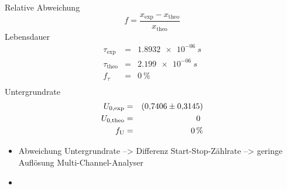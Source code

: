 Relative Abweichung
\begin{equation*}
  f=\frac{x_{\text{exp}}-x_{\text{theo}}}{x_{\text{theo}}}
\end{equation*}
Lebensdauer
\begin{align*}
  \tau_{\text{exp}}   &=&   \SI{1.8932e-06}{s} \\
  \tau_{\text{theo}}  &=&   \SI{2.199e-06}{s}\\
  f_{\tau}            &=&   \SI{0}{\%} \\
\end{align*}
Untergrundrate
\begin{align*}
  U_{\text{0,exp}}    &=&  \SI{0.7406 \pm 0.3145}{}\\
  U_{\text{0,theo}}   &=&  \SI{0}{}   \\
  f_{\text{U}}        &=&  \SI{0}{\%} \\
\end{align*}
\begin{itemize}
  \item Abweichung Untergrundrate --> Differenz Start-Stop-Zählrate --> geringe Auflösung Multi-Channel-Analyser
  \item \cite{Demtröder}
\end{itemize}
